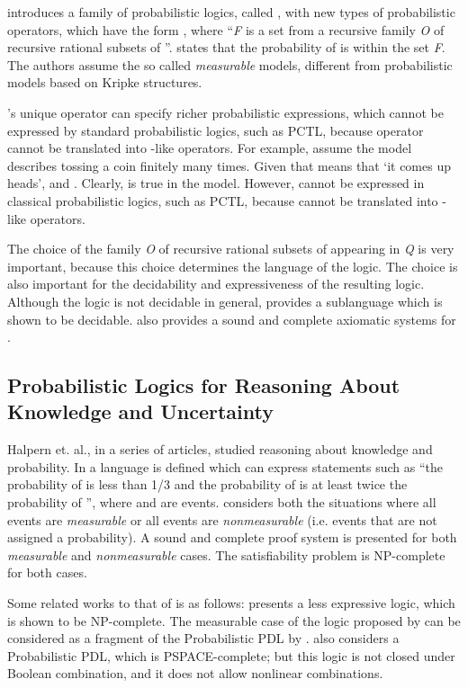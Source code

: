 \documentclass[11pt]{article}
\begin{document}
\cite{OR99} introduces a family of probabilistic logics, called ,  with new types of probabilistic operators, which have the form , where ``\emph{F} is a set from a recursive family \emph{O} of recursive rational subsets of ''.  states that the probability of  is within the set \emph{F}. The authors assume the so called \emph{measurable} models, different from probabilistic models based on Kripke structures.  

's unique operator  can specify richer probabilistic expressions, which cannot be expressed by standard probabilistic logics, such as PCTL, because operator  cannot be translated into -like operators. For example, assume the model describes tossing a coin finitely many times. Given that  means that `it comes up heads', and  \cite{OR99}. Clearly,  is true in the model. However,  cannot be expressed in classical probabilistic logics, such as PCTL, because  cannot be translated into -like operators. 

The choice of the family \emph{O} of recursive rational subsets of  appearing in \emph{Q} is very important, because this choice determines the language of the logic. The choice is also important for the decidability and expressiveness of  the resulting logic. Although the logic  is not decidable in general, \cite{OR99}  provides a sublanguage which is shown to be decidable. \cite{OR99} also provides a sound and complete axiomatic systems for .


\subsection{Probabilistic Logics for Reasoning About Knowledge and Uncertainty}



Halpern et. al., in a series of articles, studied reasoning about knowledge and probability.  In \cite{FHM90} a language is defined which can express statements such as ``the probability of  is less than 1/3 and the probability of  is at least twice the probability of '', where  and  are events. \cite{FHM90} considers both the situations where all events are \emph{measurable} or  all events are \emph{nonmeasurable} (i.e. events that are not assigned a probability). A sound and complete proof system is presented for both \emph{measurable} and \emph{nonmeasurable} cases. The satisfiability problem is NP-complete for both cases. 




Some related works to that of \cite{FHM90} is as follows: \cite{GKP88} presents a less expressive logic, which is shown to be NP-complete. The measurable case of the logic proposed by \cite{FHM90} can be considered as a fragment of the Probabilistic PDL by \cite{Fel84}. \cite{Koz83} also considers a Probabilistic PDL, which is PSPACE-complete; but this logic is not closed under Boolean combination, and it does not allow nonlinear combinations.
\end{document}
